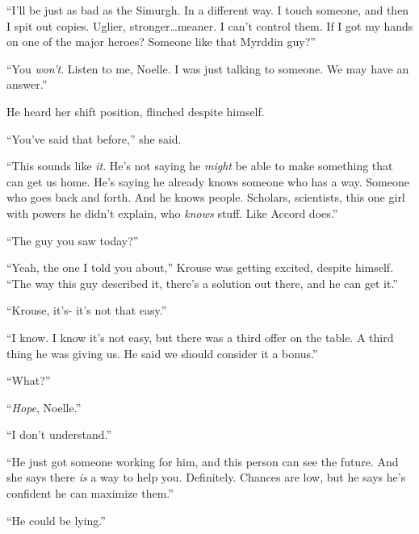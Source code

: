``I'll be just as bad as the Simurgh.  In a different way.  I touch someone, and then I spit out copies.  Uglier, stronger\ldots meaner.  I can't control them.  If I got my hands on one of the major heroes?  Someone like that Myrddin guy?''



``You \emph{won't}.  Listen to me, Noelle.  I was just talking to someone.  We may have an answer.''



He heard her shift position, flinched despite himself.



``You've said that before,'' she said.



``This sounds like \emph{it}.  He's not saying he \emph{might} be able to make something that can get us home.  He's saying he already knows someone who has a way.  Someone who goes back and forth.  And he knows people.  Scholars, scientists, this one girl with powers he didn't explain, who \emph{knows} stuff.  Like Accord does.''



``The guy you saw today?''



``Yeah, the one I told you about,'' Krouse was getting excited, despite himself.  ``The way this guy described it, there's a solution out there, and he can get it.''



``Krouse, it's- it's not that easy.''



``I know.  I know it's not easy, but there was a third offer on the table.  A third thing he was giving us.  He said we should consider it a bonus.''



``What?''



``\emph{Hope}, Noelle.''



``I don't understand.''



``He just got someone working for him, and this person can see the future.  And she says there \emph{is} a way to help you.  Definitely.  Chances are low, but he says he's confident he can maximize them.''



``He could be lying.''



